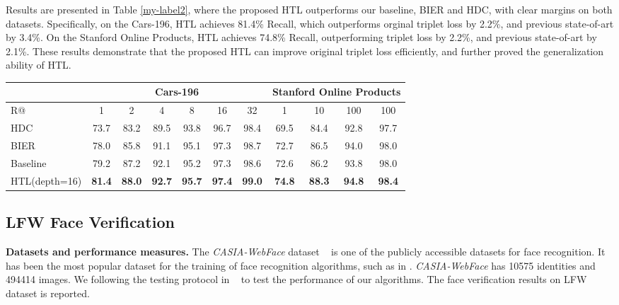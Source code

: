 \documentclass[runningheads]{llncs}
\begin{document}
Results are presented in Table \ref{my-label2}, where the proposed HTL outperforms our baseline, BIER and HDC, with clear margins on both datasets. Specifically, on the Cars-196, HTL achieves 81.4\% Recall, which outperforms orginal triplet loss by 2.2\%, and previous state-of-art by 3.4\%. On the Stanford Online Products, HTL achieves 74.8\% Recall, outperforming triplet loss by 2.2\%, and previous state-of-art by 2.1\%. These results demonstrate that the proposed HTL can improve original triplet loss efficiently, and further proved the generalization ability of HTL.
\vspace{-2em}
\begin{table*}[]\small
\setlength{\abovecaptionskip}{-5pt}
\setlength{\belowcaptionskip}{-9pt}
\centering
\begin{center}
\resizebox{0.85\textwidth}{!}
{
\begin{tabular}{l|cccccc|cccc}
\hline
\hline
              & \multicolumn{6}{c|}{Cars-196}           & \multicolumn{4}{c}{Stanford Online Products} \\ \hline
R@            & 1    & 2    & 4    & 8    & 16   & 32   & 1         & 10        & 100       & 100       \\ \hline
HDC           & 73.7 & 83.2 & 89.5 & 93.8 & 96.7 & 98.4 & 69.5      & 84.4      & 92.8      & 97.7      \\ \hline
BIER          & 78.0 & 85.8 & 91.1 & 95.1 & 97.3 & 98.7 & 72.7      & 86.5      & 94.0      & 98.0      \\ \hline
Baseline      & 79.2 & 87.2 & 92.1 & 95.2 & 97.3 & 98.6 & 72.6      & 86.2      & 93.8      & 98.0      \\ \hline
HTL(depth=16) & \textbf{81.4} & \textbf{88.0} & \textbf{92.7} & \textbf{95.7} & \textbf{97.4} & \textbf{99.0} & \textbf{74.8}      & \textbf{88.3}      & \textbf{94.8}      & \textbf{98.4}      \\ \hline
\hline
\end{tabular}
}
\end{center}
\caption{Comparison with the state-of-art on the cars-196 and Stanford products.}
\label{my-label2}
\end{table*}


\subsection{LFW Face Verification}
\noindent\textbf{Datasets and performance measures.} The \emph{CASIA-WebFace} dataset ~\cite{yi2014learning} is one of the publicly accessible datasets for face recognition. It has been the most popular dataset for the training of face recognition algorithms, such as in \cite{amos2016openface,wen2016discriminative,liu2017sphereface}. \emph{CASIA-WebFace} has 10575 identities and 494414 images. We following the testing protocol in ~\cite{yi2014learning} to test the performance of our algorithms. The face verification results on LFW dataset \cite{LFWTech} is reported.
\end{document}
